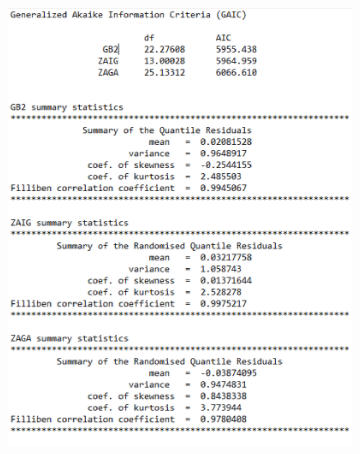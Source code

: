 \documentclass{DissertateUSU}
\begin{document}
\begin{figure}
\centering
\begin{subfigure}[b]{0.5\textwidth}
   \includegraphics[width=1\linewidth]{GAIC_statistics.eps}
   \caption{}
   \label{Residuals summary statistics} 
\end{subfigure}


\end{figure}
\end{document}

